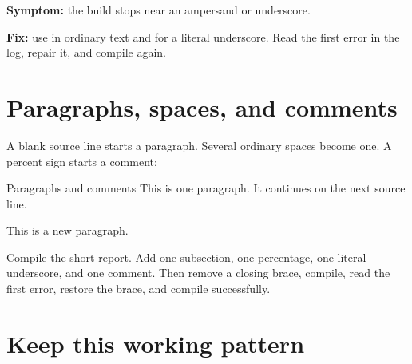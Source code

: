 
\begin{commonerror}
\textbf{Symptom:} the build stops near an ampersand or underscore.

\textbf{Fix:} use \code{\textbackslash\&} in ordinary text and
\code{\textbackslash\_} for a literal underscore. Read the first error in the
log, repair it, and compile again.
\end{commonerror}

\section{Paragraphs, spaces, and comments}

A blank source line starts a paragraph. Several ordinary spaces become one.
A percent sign starts a comment:

\begin{latexcode}{Paragraphs and comments}
This is one paragraph.
It continues on the next source line.

This is a new paragraph. %
\end{latexcode}

\begin{codelab}
Compile the short report. Add one subsection, one percentage, one literal
underscore, and one comment. Then remove a closing brace, compile, read the
first error, restore the brace, and compile successfully.
\end{codelab}

\section{Keep this working pattern}


